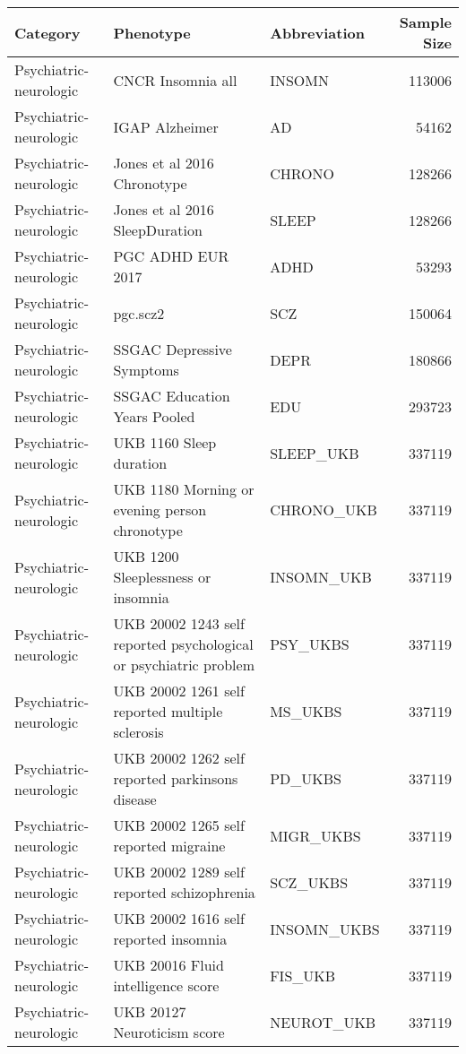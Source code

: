 \begin{table}[ht]
\centering
\begin{tabular}{lllr}
  \hline
Category & Phenotype & Abbreviation & Sample Size \\ 
  \hline
Psychiatric-neurologic & CNCR Insomnia all & INSOMN & 113006 \\ 
  Psychiatric-neurologic & IGAP Alzheimer & AD & 54162 \\ 
  Psychiatric-neurologic & Jones et al 2016 Chronotype & CHRONO & 128266 \\ 
  Psychiatric-neurologic & Jones et al 2016 SleepDuration & SLEEP & 128266 \\ 
  Psychiatric-neurologic & PGC ADHD EUR 2017 & ADHD & 53293 \\ 
  Psychiatric-neurologic & pgc.scz2 & SCZ & 150064 \\ 
  Psychiatric-neurologic & SSGAC Depressive Symptoms & DEPR & 180866 \\ 
  Psychiatric-neurologic & SSGAC Education Years Pooled & EDU & 293723 \\ 
  Psychiatric-neurologic & UKB 1160 Sleep duration & SLEEP\_UKB & 337119 \\ 
  Psychiatric-neurologic & UKB 1180 Morning or evening person chronotype & CHRONO\_UKB & 337119 \\ 
  Psychiatric-neurologic & UKB 1200 Sleeplessness or insomnia & INSOMN\_UKB & 337119 \\ 
  Psychiatric-neurologic & UKB 20002 1243 self reported psychological or psychiatric problem & PSY\_UKBS & 337119 \\ 
  Psychiatric-neurologic & UKB 20002 1261 self reported multiple sclerosis & MS\_UKBS & 337119 \\ 
  Psychiatric-neurologic & UKB 20002 1262 self reported parkinsons disease & PD\_UKBS & 337119 \\ 
  Psychiatric-neurologic & UKB 20002 1265 self reported migraine & MIGR\_UKBS & 337119 \\ 
  Psychiatric-neurologic & UKB 20002 1289 self reported schizophrenia & SCZ\_UKBS & 337119 \\ 
  Psychiatric-neurologic & UKB 20002 1616 self reported insomnia & INSOMN\_UKBS & 337119 \\ 
  Psychiatric-neurologic & UKB 20016 Fluid intelligence score & FIS\_UKB & 337119 \\ 
  Psychiatric-neurologic & UKB 20127 Neuroticism score & NEUROT\_UKB & 337119 \\ 

\end{tabular}
\end{table}
